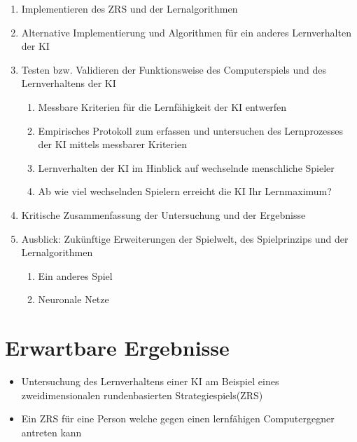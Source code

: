 \documentclass[12pt,a4paper]{article}
\begin{document}
\begin{enumerate}
	\item Implementieren des ZRS und der Lernalgorithmen
	
	\item Alternative Implementierung und Algorithmen für ein anderes Lernverhalten der KI
	
	\item Testen bzw. Validieren der Funktionsweise des Computerspiels und des Lernverhaltens der KI
	\begin{enumerate}
		\item Messbare Kriterien für die Lernfähigkeit der KI entwerfen
		\item Empirisches Protokoll zum erfassen und untersuchen des Lernprozesses der KI mittels messbarer Kriterien
		\item Lernverhalten der KI im Hinblick auf wechselnde menschliche Spieler
		\item Ab wie viel wechselnden Spielern erreicht die KI Ihr Lernmaximum?
	\end{enumerate}
	
	\item Kritische Zusammenfassung der Untersuchung und der Ergebnisse
	
	\item Ausblick: Zukünftige Erweiterungen der Spielwelt, des Spielprinzips und der Lernalgorithmen
	\begin{enumerate}
		\item Ein anderes Spiel
		\item Neuronale Netze
	\end{enumerate}
	
\end{enumerate}

\section*{Erwartbare Ergebnisse}
\begin{itemize}
	\item Untersuchung des Lernverhaltens einer KI am Beispiel eines zweidimensionalen rundenbasierten Strategiespiels(ZRS)
	\item Ein ZRS für eine Person welche gegen einen lernfähigen Computergegner antreten kann 
\end{itemize}
\end{document}
